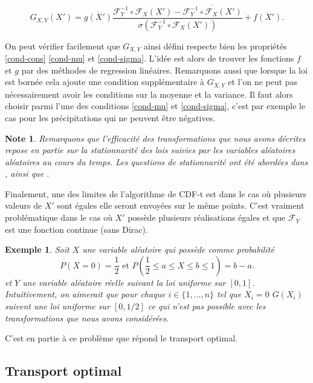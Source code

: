 \documentclass[a4paper,11pt]{article}
\numberwithin{equation}{section}
\newtheorem{example}{Exemple}
\newtheorem{note}{Note}
\begin{document}
\[ G_{X,Y} (X')= \overline{g(X')}\frac{\mathcal{F}^{-1}_{Y}\circ\mathcal{F}_{X}(X')- \overline{\mathcal{F}^{-1}_{Y}\circ\mathcal{F}_{X}(X')}}{\sigma(\mathcal{F}^{-1}_{Y}\circ\mathcal{F}_{X}(X'))} + \overline{f(X')}.\]

On peut vérifier facilement que $G_{X,Y}$ ainsi défini respecte bien les propriétés \eqref{cond-cons} \eqref{cond-mu} et \eqref{cond-sigma}. L'idée est alors de trouver les fonctions $f$ et $g$ par des méthodes de regression linéaires. Remarquons aussi que lorsque la loi est bornée cela ajoute une condition supplémentaire à $G_{X,Y}$ et l'on ne peut pas nécessairement avoir les conditions sur la moyenne et la variance. Il faut alors choisir parmi l'une des conditions \eqref{cond-mu} et \eqref{cond-sigma}, c'est par exemple le cas pour les précipitations qui ne peuvent être négatives. 
\begin{note}
	Remarquons que l'efficacité des transformations que nous avons décrites repose en partie sur la stationnarité des lois suivies par les variables aléatoires aléatoires au cours du temps. Les questions de stationnarité ont été abordées dans \cite{maraun2012nonstationarities}, \cite{christensen2008need} ainsi que \cite{nahar2017assessing}.  
\end{note}

Finalement, une des limites de l'algorithme de CDF-t est dans le cas où plusieurs valeurs de $X'$ sont égales elle seront envoyées sur le même points. C'est vraiment problématique dans le cas où $X'$ possède plusieurs réalisations égales et que $\mathcal{F}_Y$ est une fonction continue (sans Dirac).

\begin{example}
	Soit $X$ une variable aléatoire qui possède comme probabilité 
	\[P(X=0)=\frac{1}{2} \textrm{ et } P( \frac{1}{2}\leq a\leq X \leq b\leq 1 )=b-a.\]
	et $Y$ une variable aléatoire réelle suivant la loi uniforme sur $[0,1]$. Intuitivement, on aimerait que pour chaque $i\in \{1,...,n\}$ tel que $X_i=0$ $G(X_i)$ suivent une loi uniforme sur $[0,1/2]$ ce qui n'est pas possible avec les transformations que nous avons considérées.
\end{example}  

C'est en partie à ce problème que répond le transport optimal.

\subsection{Transport optimal}
\label{ch:transport-optimal}
\end{document}
